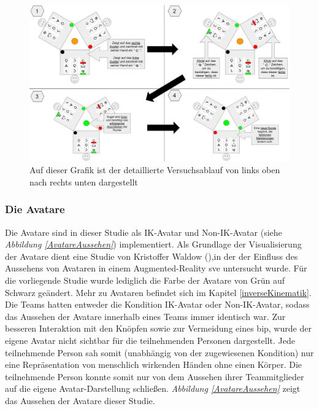 \documentclass[a4paper,11pt]{article}%
\renewcommand{\\}{\vspace*{0.5\baselineskip} \newline}
\begin{document}
	\begin{figure}[h]
		\begin{footnotesize}
		\centering
			\includegraphics[scale=0.30]{Abbildungen/DetaillierterVersuchsablauf.JPG}		
			\caption[Darstellung des Versuchsablauf]{Auf dieser Grafik ist der detaillierte Versuchsablauf von links oben nach rechts unten dargestellt}
			\label{DetaillierterVersuchsablauf}
		\end{footnotesize}
	\end{figure}

	\subsubsection{Die Avatare}
\label{IKNIK}
Die Avatare sind in dieser Studie als \dq{}IK-Avatar\dq{} und \dq{}Non-IK-Avatar\dq{} (siehe \textit{Abbildung \ref{AvatareAussehen}}) implementiert. Als Grundlage der Visualisierung der Avatare dient eine Studie von Kristoffer Waldow (\citep{waldow2019investigating}),in der der Einfluss des Aussehens von Avataren in einem Augmented-Reality \ac{sve} untersucht wurde.  Für die vorliegende Studie wurde lediglich die Farbe der Avatare von Grün auf Schwarz geändert. 
Mehr zu Avataren befindet sich im Kapitel \ref{inverseKinematik}.
Die Teams hatten entweder die Kondition \dq{}IK-Avatar\dq{} oder \dq{}Non-IK-Avatar\dq{}, sodass das Aussehen der Avatare innerhalb eines Teams immer identisch war. Zur besseren Interaktion mit den Knöpfen sowie zur Vermeidung eines \ac{bip}, wurde der eigene Avatar nicht sichtbar für die teilnehmenden Personen dargestellt. Jede teilnehmende Person sah somit (unabhängig von der zugewiesenen Kondition) nur eine Repräsentation von menschlich wirkenden Händen ohne einen Körper. Die teilnehmende Person konnte somit nur von dem Aussehen ihrer Teammitglieder auf die eigene Avatar-Darstellung schließen. \textit{Abbildung \ref{AvatareAussehen}} zeigt das Aussehen der Avatare dieser Studie.
\end{document}
